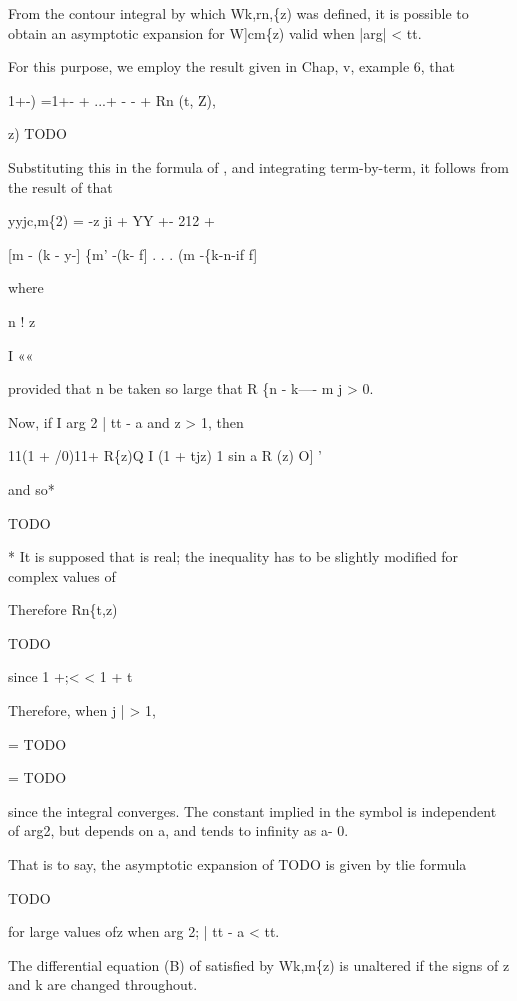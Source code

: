 From the contour integral by which Wk,rn,\{z) was defined, it is
possible to obtain an asymptotic expansion for W]cm\{z) valid when
|arg| < tt.

For this purpose, we employ the result given in Chap, v, example 6,
that

1+-) =1+- + ...+ - - + Rn (t, Z),

z) TODO

Substituting this in the formula of , and integrating
term-by-term, it follows from the result of  that

yyjc,m\{2) =  -z ji + YY +- 212 +

[m - (k - y-] \{m' -(k- f] . . . (m -\{k-n-if f]

where

n ! z

I ««

provided that n be taken so large that R \{n - k---- m j > 0.

Now, if I arg 2 |  tt - a and z > 1, then

11(1 + /0)11+ R\{z)Q I (1 + tjz) 1  sin a R (z)  O] '

and so*

TODO

* It is supposed that is real; the inequality has to be slightly
modified for complex values of

%
%

Therefore Rn\{t,z)

TODO

since 1 +;< < 1 + t

Therefore, when j  | > 1,

= TODO

= TODO

since the integral converges. The constant implied in the symbol is
independent of arg2, but depends on a, and tends to infinity as a-
0.

That is to say, the asymptotic expansion of TODO is given by tlie
formula

TODO

for large values ofz when arg 2; |  tt - a < tt.


The differential equation (B) of  satisfied by Wk,m\{z) is
unaltered if the signs of z and k are changed throughout.

